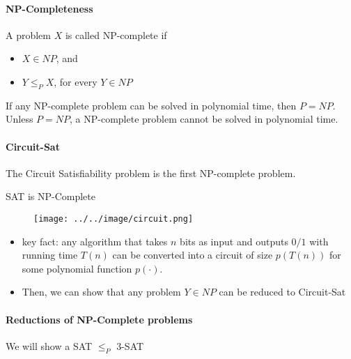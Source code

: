             \paragraph{NP-Completeness}
                A problem $X$ is called NP-complete if
                \begin{itemize}
                    \item $X \in NP$, and
                    \item $Y \le_P X$, for every $Y \in NP$
                \end{itemize}

                If any NP-complete problem can be solved in polynomial time, then $P = NP$. Unless $P = NP$, a NP-complete problem cannot be solved in polynomial time.

            \paragraph{Circuit-Sat}
                The Circuit Satisfiability problem is the first NP-complete problem.

                \begin{theorem}
                    SAT is NP-Complete
                \end{theorem}

                \begin{figure}[H]
                    \centering
                    \texttt{[image: ../../image/circuit.png]}
                \end{figure}

                \begin{itemize}
                    \item key fact: any algorithm that takes $n$ bits as input and outputs $0/1$ with running time $T(n)$ can be converted into a circuit of size $p(T(n))$ for some polynomial function $p(\cdot)$.
                    \item Then, we can show that any problem $Y \in NP$ can be reduced to Circuit-Sat
                \end{itemize}

            \paragraph{Reductions of NP-Complete problems}
                We will show a SAT $\le_P$ 3-SAT

